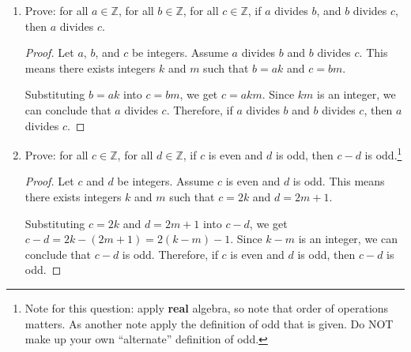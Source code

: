 \documentclass{article}
\begin{document}
\begin{enumerate}
\begin{proof}
              Then, using H2, we know that if $\neg b$ is true, then $j$ is true. Since $\neg
                  b$ is true, $j$ must be true.

              Since $j$ is true, we can apply H7 to conclude that $m$ is true.

              By H8, if $k$ were true, it would contradict our previous finding that $m$ is
              true. Therefore, $k$ must be false ($\neg k$ must be true).

              Finally, using H3, we know that if $\neg k$ is true, then $f$ is true. Since
              $\neg k$ is true, $f$ must be true.

          \end{proof}

          \newpage

    \item Prove: for all $a \in \mathbb{Z}$, for all $b \in \mathbb{Z}$, for all $c \in
              \mathbb{Z}$, if $a$ divides $b$, and $b$ divides $c$, then $a$ divides $c$.

          \begin{proof}
              Let $a$, $b$, and $c$ be integers. Assume $a$ divides $b$ and $b$ divides $c$. This means there exists integers $k$ and $m$ such that $b = ak$ and $c = bm$.

              Substituting $b = ak$ into $c = bm$, we get $c = akm$. Since $km$ is an
              integer, we can conclude that $a$ divides $c$. Therefore, if $a$ divides $b$
              and $b$ divides $c$, then $a$ divides $c$.
          \end{proof}

          \newpage

    \item Prove: for all $c \in \mathbb{Z}$, for all $d \in \mathbb{Z}$, if $c$ is even
          and $d$ is odd, then $c-d$ is odd.\footnote{Note for this question: apply {\bf
                      real} algebra, so note that order of operations matters. As another note apply
              the definition of odd that is given. Do NOT make up your own ``alternate''
              definition of odd.}

          \begin{proof}
              Let $c$ and $d$ be integers. Assume $c$ is even and $d$ is odd. This means there exists integers $k$ and $m$ such that $c = 2k$ and $d = 2m + 1$.

              Substituting $c = 2k$ and $d = 2m + 1$ into $c - d$, we get $c - d = 2k - (2m +
                  1) = 2(k - m) - 1$. Since $k - m$ is an integer, we can conclude that $c - d$
              is odd. Therefore, if $c$ is even and $d$ is odd, then $c - d$ is odd.
          \end{proof}


\end{enumerate}
\end{document}
